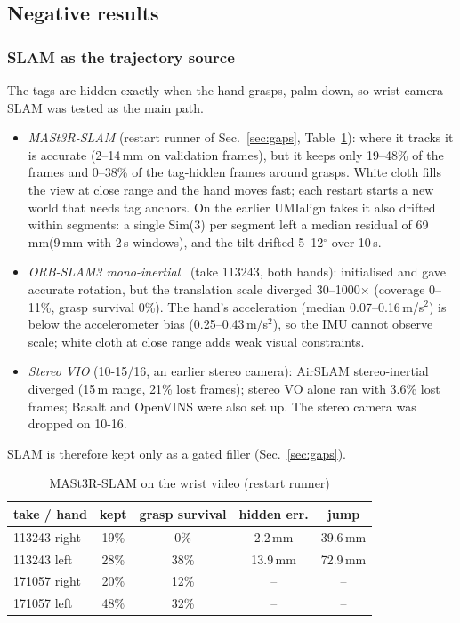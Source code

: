 \documentclass[conference,10pt]{IEEEtran}
\newcommand{\mm}{\,mm\xspace}
\begin{document}
\subsection{Negative results}\label{sec:neg}
\subsubsection{SLAM as the trajectory source}\label{sec:slam}
The tags are hidden exactly when the hand grasps, palm down, so wrist-camera SLAM was tested as the main path.
\begin{itemize}
\item \emph{MASt3R-SLAM} (restart runner of Sec.~\ref{sec:gaps}, Table~\ref{tab:slam}): where it tracks it is accurate
  (2--14\mm on validation frames), but it keeps only 19--48\% of the frames and 0--38\% of the tag-hidden frames around
  grasps. White cloth fills the view at close range and the hand moves fast; each restart starts a new world that needs tag
  anchors. On the earlier UMIalign takes it also drifted within segments: a single Sim(3) per segment left a median
  residual of 69\mm (9\mm with 2\,s windows), and the tilt drifted 5--12$^\circ$ over 10\,s.
\item \emph{ORB-SLAM3 mono-inertial}~\cite{campos2021orbslam3} (take 113243, both hands): initialised and gave accurate
  rotation, but the translation scale diverged 30--1000$\times$ (coverage 0--11\%, grasp survival 0\%). The hand's
  acceleration (median 0.07--0.16\,m/s$^2$) is below the accelerometer bias (0.25--0.43\,m/s$^2$), so the IMU cannot
  observe scale; white cloth at close range adds weak visual constraints.
\item \emph{Stereo VIO} (10-15/16, an earlier stereo camera): AirSLAM stereo-inertial diverged (15\,m range, 21\% lost
  frames); stereo VO alone ran with 3.6\% lost frames; Basalt and OpenVINS were also set up. The stereo camera was dropped
  on 10-16.
\end{itemize}
SLAM is therefore kept only as a gated filler (Sec.~\ref{sec:gaps}).

\begin{table}[t]
\caption{MASt3R-SLAM on the wrist video (restart runner)}\label{tab:slam}
\centering\small
\begin{tabular}{@{}lcccc@{}}
\toprule
take / hand & kept & grasp survival & hidden err. & jump \\
\midrule
113243 right & 19\% & 0\% & 2.2\mm & 39.6\mm \\
113243 left & 28\% & 38\% & 13.9\mm & 72.9\mm \\
171057 right & 20\% & 12\% & -- & -- \\
171057 left & 48\% & 32\% & -- & -- \\
\bottomrule
\end{tabular}
\end{table}
\end{document}
